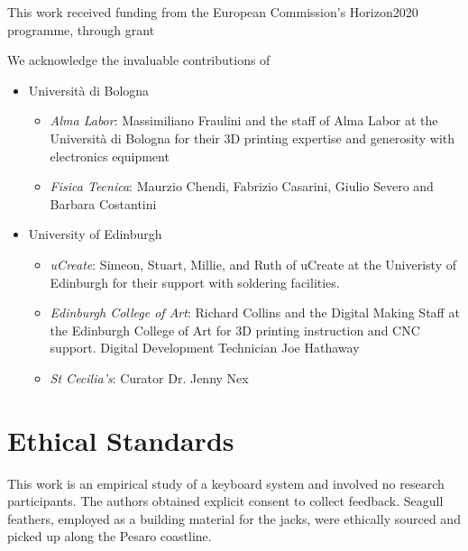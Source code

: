 \documentclass[sigconf]{nimeart}
\begin{document}
\maketitle




\begin{acks}
This work received funding from the European Commission's Horizon2020 programme, through grant 

 We acknowledge the invaluable contributions of
\begin{itemize}
\item
  Università di Bologna
  \begin{itemize}
  \item
    \emph{Alma Labor}:
      Massimiliano Fraulini and the staff of Alma Labor at the Università
      di Bologna for their 3D printing expertise and generosity with
      electronics equipment
  \item
    \emph{Fisica Tecnica}: Maurzio Chendi, Fabrizio Casarini, Giulio Severo and Barbara
      Costantini    
  \end{itemize}
\item
  University of Edinburgh
  \begin{itemize}
  \item
    \emph{uCreate}:    
      Simeon, Stuart, Millie, and Ruth of uCreate at the Univeristy of
      Edinburgh for their support with soldering facilities.    
  \item
    \emph{Edinburgh College of Art}: Richard Collins and the Digital Making Staff at the Edinburgh
      College of Art for 3D printing instruction and CNC support. Digital Development Technician Joe Hathaway    
    \item  
      \emph{St Cecilia's}: Curator Dr. Jenny Nex
  \end{itemize}
\end{itemize}

\end{acks}


\section{Ethical Standards}
This work is an empirical study of a keyboard system and
involved no research participants. The authors obtained explicit consent to collect feedback. Seagull feathers, employed as a building material for the jacks, were ethically sourced and picked up along the Pesaro coastline. 



\end{document}
